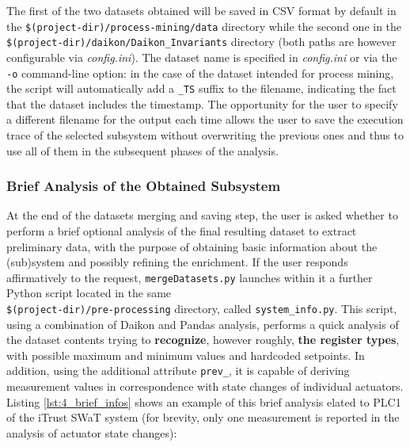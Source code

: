 \bigskip
The first of the two datasets obtained will be saved in CSV format by default in the \texttt{\$(project-dir)/process-mining/data} directory while the second one in the \texttt{\$(project-dir)/daikon/Daikon\_Invariants} directory (both paths are however configurable via \textit{config.ini}).\newline
The dataset name is specified in \textit{config.ini} or via the \texttt{-o} command-line option: in the case of the dataset intended for process mining, the script will automatically add a \texttt{\_TS} suffix to the filename, indicating the fact that the dataset includes the timestamp.\newline
The opportunity for the user to specify a different filename for the output each time allows the user to save the execution trace of the selected subsystem without overwriting the previous ones and thus to use all of them in the subsequent phases of the analysis.

\subsubsection{Brief Analysis of the Obtained Subsystem}
\label{subsubsec:4_brief_analysis}

At the end of the datasets merging and saving step, the user is asked whether to perform a brief optional analysis of the final resulting dataset to extract preliminary data, with the purpose of obtaining basic information about the (sub)system and possibly refining the enrichment.\newline
If the user responds affirmatively to the request, \texttt{mergeDatasets.py} launches within it a further Python script located in the same\\ \texttt{\$(project-dir)/pre-processing} directory, called \texttt{system\_info.py}. This script, using a combination of Daikon and Pandas analysis, performs a quick analysis of the dataset contents trying to \textbf{recognize}, however roughly, \textbf{the register types}, with possible maximum and minimum values and hardcoded setpoints. In addition, using the additional attribute \texttt{prev\_}, it is capable of deriving measurement values in correspondence with state changes of individual actuators.\newline 
Listing \ref{lst:4_brief_infos} shows an example of this brief analysis elated to PLC1 of the iTrust SWaT system (for brevity, only one measurement is reported in the analysis of actuator state changes):

